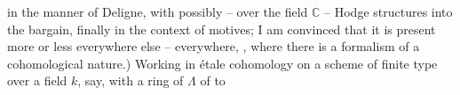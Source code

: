 in the manner of Deligne, with possibly -- over the field $\mathbb{C}$ -- Hodge structures into the bargain, finally in the context of motives; I am convinced that it is present
more or less everywhere else -- everywhere, , where there is a formalism of a cohomological nature.) Working in étale cohomology on a  scheme
of finite type over a field $k$, say,
with a ring of  $\Lambda$ of   to  
